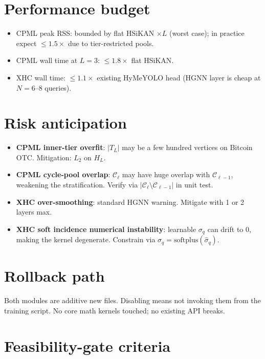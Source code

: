 \documentclass[10pt]{article}
\begin{document}
\section*{Performance budget}

\begin{itemize}
  \item CPML peak RSS: bounded by flat HSiKAN $\times L$ (worst case);
    in practice expect $\le 1.5 \times$ due to tier-restricted pools.
  \item CPML wall time at $L = 3$: $\le 1.8 \times$ flat HSiKAN.
  \item XHC wall time: $\le 1.1 \times$ existing HyMeYOLO head
    (HGNN layer is cheap at $N = 6$--$8$ queries).
\end{itemize}

\section*{Risk anticipation}

\begin{itemize}
  \item \textbf{CPML inner-tier overfit}: $|T_L|$ may be a few hundred
    vertices on Bitcoin OTC. Mitigation: $L_2$ on $H_L$.
  \item \textbf{CPML cycle-pool overlap}: $\mathcal{C}_\ell$ may have
    huge overlap with $\mathcal{C}_{\ell-1}$, weakening the
    stratification. Verify via $|\mathcal{C}_\ell \setminus \mathcal{C}_{\ell-1}|$
    in unit test.
  \item \textbf{XHC over-smoothing}: standard HGNN warning. Mitigate
    with 1 or 2 layers max.
  \item \textbf{XHC soft incidence numerical instability}:
    learnable $\sigma_q$ can drift to $0$, making the kernel
    degenerate. Constrain via $\sigma_q = \mathrm{softplus}(\hat{\sigma}_q)$.
\end{itemize}

\section*{Rollback path}

Both modules are additive new files. Disabling means not invoking
them from the training script. No core math kernels touched; no
existing API breaks.

\section*{Feasibility-gate criteria}
\end{document}
